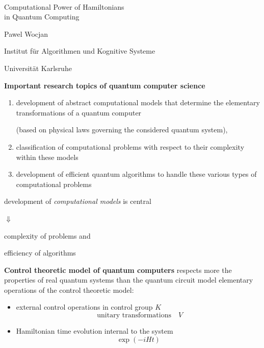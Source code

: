 \documentclass[portrait]{seminar}
\begin{document}
\begin{slide}
{$ $}
\vfill
\begin{center}
{\Large \blue Computational Power of Hamiltonians\\ 
in Quantum Computing}

\vfill Pawel Wocjan

{\small Institut f\"ur Algorithmen und Kognitive Systeme}

{\small Universit\"at Karlsruhe}
\end{center}
\vfill
\end{slide}

%
%

\begin{slide}
{\large {\bf Important research topics of quantum computer science}}
\vfill
\begin{enumerate}
\item development of abstract {\red computational models} that
determine the elementary transformations of a quantum computer 

(based on physical laws governing the considered quantum system),
\item classification of {\red computational problems} with
respect to their complexity within these models
\item development of {\red efficient quantum algorithms} to handle these
various types of computational problems
\end{enumerate}
\vfill
development of {\it computational models} is central 

\hspace{4cm} {\huge $\Downarrow$} 

\hspace{3cm} complexity of problems and 

\hspace{3cm} efficiency of algorithms
\vfill
\end{slide}


\begin{slide}
{\large {\bf Control theoretic model of quantum computers}}
\vfill
respects more the properties of real quantum systems than the
quantum circuit model
\vfill
{\blue elementary operations of the control theoretic model}:
\begin{itemize}
\item external control operations in control
group $K$
\[
\mbox{       unitary transformations}\quad
V
\]
\item Hamiltonian time evolution internal to the system
\[
\exp(-i H t)
\]
\vfill
\end{itemize}
\end{slide}
\end{document}
